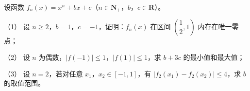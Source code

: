 \begin{question}
设函数 $f_n(x)=x^n+bx+c$（$n\in\mathbf N_+$，$b$，$c\in\mathbf R$）。

（1） 设 $n\geqslant2$，$b=1$，$c=-1$，证明：$f_n(x)$ 在区间 $\left(\dfrac12,1\right)$ 内存在唯一零点；

（2） 设 $n$ 为偶数，$|f(-1)|\leqslant1$，$|f(1)|\leqslant1$，求 $b+3c$ 的最小值和最大值；

（3） 设 $n=2$，若对任意 $x_1$，$x_2\in[-1,1]$，有 $|f_2(x_1)-f_2(x_2)|\leqslant4$，求 $b$ 的取值范围。

\clearpage

\end{question}